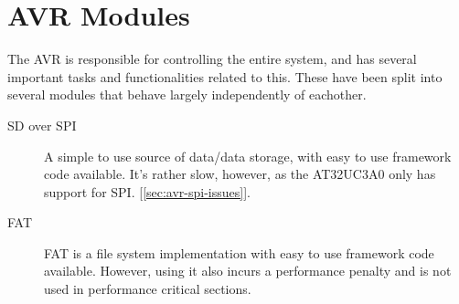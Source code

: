 \section{AVR Modules}


The AVR is responsible for controlling the entire system, and has several
important tasks and functionalities related to this. These have been split
into several modules that behave largely independently of eachother.
\begin{description}

\item[SD over SPI] A simple to use source of data/data storage, with easy to use
  framework code available. It's rather slow, however, as the AT32UC3A0 only has
  support for \ac{SPI}. [\ref{sec:avr-spi-issues}].


\item[FAT] \ac{FAT} is a file system implementation with easy to use framework
  code available. However, using it also incurs a performance penalty and is not
  used in performance critical sections.



\end{description}
